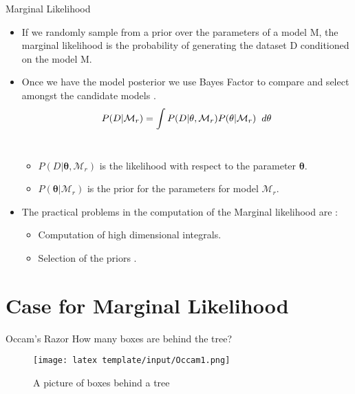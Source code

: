 \documentclass[t, aspectratio=169]{beamer}
\begin{document}
 \begin{frame}{Marginal Likelihood}
 \vspace{0.7cm}
 \begin{itemize}
 \item If we randomly sample from a prior over the parameters of a model M, the marginal likelihood is the probability of generating the dataset D conditioned on the model M.
  \item Once we have the model posterior we use Bayes Factor to compare and select amongst the candidate models \cite{Lofti}.\\
  \[P(D|\mathcal{M}_r) = \int P(D|\mathbf{\theta},\mathcal{M}_r) P(\mathbf{\theta}|\mathcal{M}_r)\hspace{0.2cm} d\mathbf{\theta} \]\\
  \vspace{0.3cm}
  \begin{itemize}
   
   
      \item \(P(D|\mathbf{\theta}, \mathcal{M}_r)\) is the likelihood with respect to the parameter \(\mathbf{\theta}\).
      \item \(P(\mathbf{\theta}|\mathcal{M}_r)\) is the prior for the parameters for model \(\mathcal{M}_r\).

  \end{itemize}
  \vspace{1cm}
  \item The practical problems in the computation of the Marginal likelihood are \cite{Wasserman}:
  \vspace{0.7cm}
\begin{itemize}
    \item Computation of high dimensional integrals.
    \item Selection of the priors . 
\end{itemize}

\end{itemize}
 \end{frame}  
 

\section{Case for Marginal Likelihood}
 \begin{frame}{Occam's Razor}
 \vspace{0.3cm}
 How many boxes are behind the tree?
  \vspace{0.1cm}
 \begin{figure}
 \texttt{[image: latex template/input/Occam1.png]}
 \caption{A picture of boxes behind a tree \cite{Mackay}}
 
 \end{figure}

 \end{frame} 
 
\end{document}
